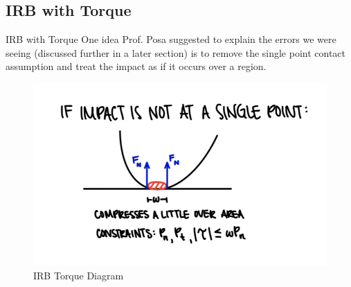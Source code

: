 \subsection{IRB with Torque}
\begin{frame}{IRB with Torque}
One idea Prof. Posa suggested to explain the errors we were seeing (discussed further in a later section) is to remove the single point contact assumption and treat the impact as if it occurs over a region.
    \begin{figure}
        \centering
        \includegraphics[scale=0.6]{figures/IRBTorque.png}
        \caption{IRB Torque Diagram}
        \label{fig:IRBTorque}
\end{figure}
\end{frame}

